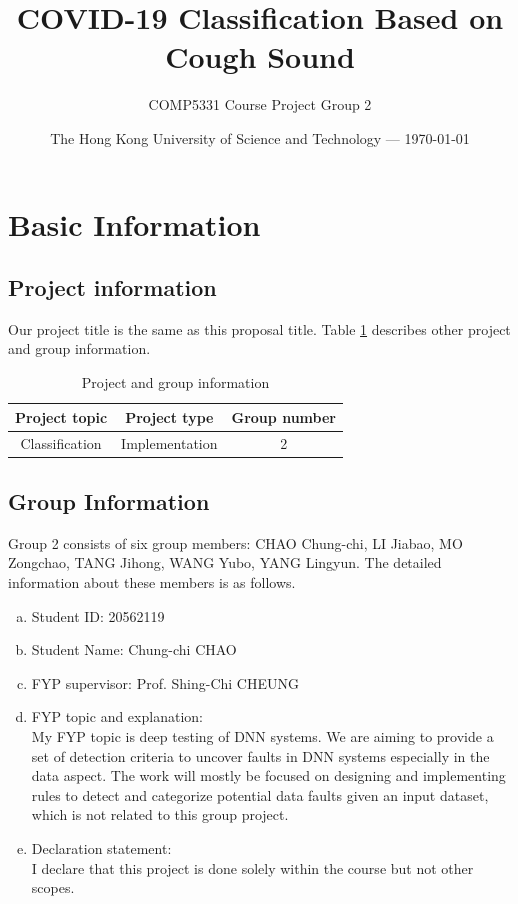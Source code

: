 \documentclass[11pt]{article}
\title{COVID-19 Classification Based on Cough Sound} %
\author{COMP5331 Course Project Group 2} %
\date{The Hong Kong University of Science and Technology --- \today} %
\begin{document}
\maketitle %


\section{Basic Information}
\subsection{Project information}
Our project title is the same as this proposal title. Table \ref{tab1} describes other project and
group information.
\begin{table}[!htbp]
	\caption{Project and group information} \centering
	\label{tab1}
	\begin{tabular}{ccc}
	\toprule[1.5pt]
	Project topic  & Project type & Group number \\
    \midrule[1pt]
    Classification & Implementation & 2 \\
	\bottomrule[1.5pt]
	\end{tabular}
\end{table}

\subsection{Group Information}
Group 2 consists of six group members: CHAO Chung-chi, LI Jiabao, MO Zongchao, TANG Jihong,
WANG Yubo, YANG Lingyun. The detailed information about these members is as
follows.

\begin{member}
	\begin{enumerate}[(a)]
		\item Student ID: 20562119
		\item Student Name: Chung-chi CHAO
		\item FYP supervisor: Prof. Shing-Chi CHEUNG
		\item FYP topic and explanation: \\
		My FYP topic is deep testing of DNN systems. We are aiming to provide a set of detection criteria to uncover faults in DNN systems especially in the data aspect. The work will mostly be focused on designing and implementing rules to detect and categorize potential data faults given an input dataset, which is not related to this group project.
		\item Declaration statement: \\
		I declare that this project is done solely within the course but not other scopes.
	\end{enumerate}
\end{member}
\end{document}
